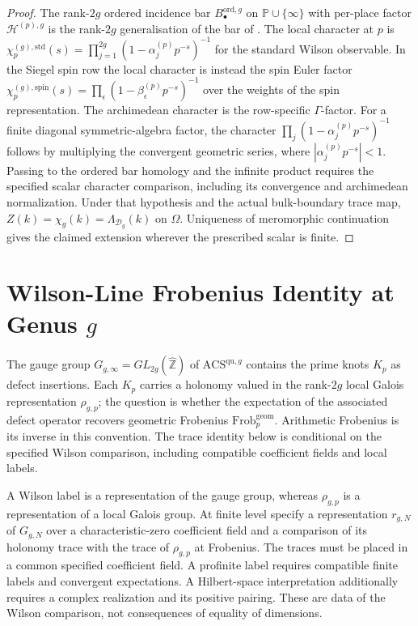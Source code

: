 \begin{proof}
The rank-\(2g\) ordered incidence bar \(B^{\mathrm{ord},g}_{\bullet}\) on
\(\mathbb{P}\cup\{\infty\}\) with per-place factor \(\mathcal{H}^{(p),g}\)
is the rank-\(2g\) generalisation of the bar of
. The local character at \(p\) is
\(\chi_{p}^{(g),\mathrm{std}}(s)=\prod_{j=1}^{2g}(1-\alpha_{j}^{(p)}p^{-s})^{-1}\)
for the standard Wilson observable. In the Siegel spin row the local
character is instead the spin Euler factor
\(\chi_{p}^{(g),\mathrm{spin}}(s)=\prod_{\epsilon}(1-\beta_{\epsilon}^{(p)}p^{-s})^{-1}\)
over the weights of the spin representation. The archimedean character
is the row-specific \(\Gamma\)-factor. For a finite diagonal symmetric-algebra factor, the character
$\prod_j(1-\alpha_j^{(p)}p^{-s})^{-1}$ follows by multiplying the
convergent geometric series, where $|\alpha_j^{(p)}p^{-s}|<1$.
Passing to the ordered bar homology and the infinite product requires
the specified scalar character comparison, including its convergence
and archimedean normalization. Under that hypothesis and the actual
bulk-boundary trace map, $Z(k)=\chi_g(k)=\Lambda_{\mathcal D_g}(k)$
on $\Omega$. Uniqueness of meromorphic continuation gives the claimed
extension wherever the prescribed scalar is finite.
\end{proof}

\section{Wilson-Line Frobenius Identity at Genus \(g\)}
\label{v4-arith:w9-r6:wilson-line-g}

The gauge group \(G_{g,\infty}=GL_{2g}(\widehat{\mathbb{Z}})\) of
\(\mathrm{ACS}^{\mathrm{qu},g}\) contains the prime knots \(K_{p}\) as
defect insertions. Each \(K_{p}\) carries a holonomy valued in the
rank-\(2g\) local Galois representation \(\rho_{g,p}\); the question is
whether the expectation of the associated defect operator recovers
geometric Frobenius \(\mathrm{Frob}_{p}^{\mathrm{geom}}\). Arithmetic
Frobenius is its inverse in this convention. The trace identity below is conditional on the specified Wilson
comparison, including compatible coefficient fields and local labels.

A Wilson label is a representation of the gauge group, whereas
$\rho_{g,p}$ is a representation of a local Galois group.
At finite level specify a representation $r_{g,N}$ of $G_{g,N}$
over a characteristic-zero coefficient field and a comparison of
its holonomy trace with the trace of $\rho_{g,p}$ at Frobenius.
The traces must be placed in a common specified coefficient field.
A profinite label requires compatible finite labels and convergent
expectations. A Hilbert-space interpretation additionally requires
a complex realization and its positive pairing. These are data of
the Wilson comparison, not consequences of equality of dimensions.

